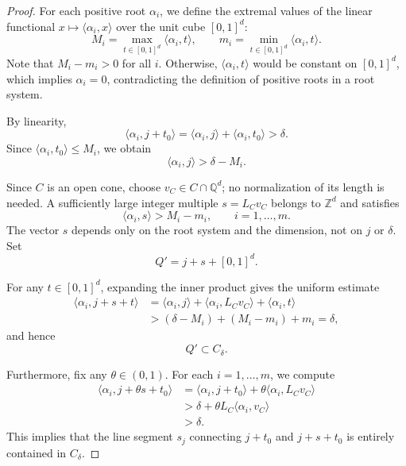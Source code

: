 \documentclass[12pt]{article}
\begin{document}
\begin{proof}
For each positive root $\alpha_i$, we define the extremal values of the linear functional $x \mapsto \langle \alpha_i, x \rangle$ over the unit cube $[0,1]^d$:
\[
M_i = \max_{t\in[0,1]^d} \langle \alpha_i, t \rangle, \qquad m_i = \min_{t\in[0,1]^d} \langle \alpha_i, t \rangle.
\]
Note that $M_i - m_i > 0$ for all $i$. Otherwise, $\langle \alpha_i, t \rangle$ would be constant on $[0,1]^d$, which implies $\alpha_i = 0$, contradicting the definition of positive roots in a root system.

By linearity,
\[
\langle \alpha_i, j + t_0 \rangle = \langle \alpha_i, j \rangle + \langle \alpha_i, t_0 \rangle > \delta.
\]
Since $\langle \alpha_i, t_0 \rangle \le M_i$, %
we obtain
\[
\langle \alpha_i, j \rangle > \delta - M_i.
\]

Since $C$ is an open cone, choose $v_C\in C\cap\mathbb{Q}^d$; no normalization of its length is needed. A sufficiently large integer multiple $s=L_Cv_C$ belongs to $\mathbb{Z}^d$ and satisfies
\[
\langle\alpha_i,s\rangle>M_i-m_i,\qquad i=1,\dots,m.
\]
The vector $s$ depends only on the root system and the dimension, not on $j$ or $\delta$. Set
\[
Q'=j+s+[0,1]^d.
\]

For any $t \in [0,1]^d$, expanding the inner product gives the uniform estimate
\begin{align*}
\langle \alpha_i, j + s + t \rangle
&= \langle \alpha_i, j \rangle + \langle \alpha_i, L_C v_C \rangle + \langle \alpha_i, t \rangle \\
&> (\delta - M_i) + (M_i - m_i) + m_i = \delta,
\end{align*}
and hence
\[
Q' \subset C_\delta.
\]

Furthermore, fix any $\theta \in (0,1)$. For each $i = 1,\dots,m$, we compute
\begin{align*}
\langle \alpha_i, j + \theta s + t_0 \rangle
&= \langle \alpha_i, j + t_0 \rangle + \theta \langle \alpha_i, L_C v_C \rangle \\
&> \delta + \theta L_C \langle \alpha_i, v_C \rangle \\
&> \delta.
\end{align*}
This implies that the line segment $s_j$ connecting $j + t_0$ and $j + s + t_0$ is entirely contained in $C_\delta$.


\end{proof}
\end{document}
